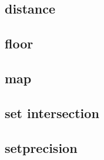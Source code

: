     \subsection{distance}
            
    \subsection{floor}
            
    \subsection{map}
            
    \subsection{set intersection}
            
    \subsection{setprecision}
            